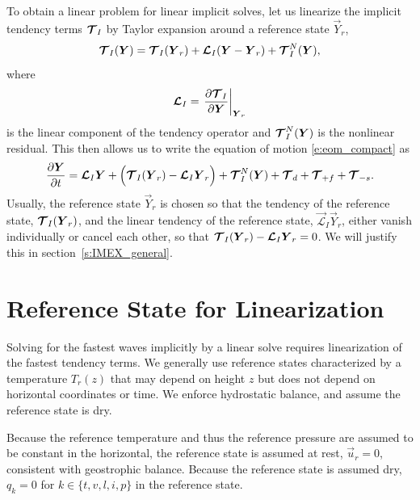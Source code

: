 \documentclass{report}
\begin{document}
To obtain a linear problem for linear implicit solves, let us linearize the implicit tendency terms $\boldsymbol{{\mathcal{T}}}_{I}$ by Taylor expansion around a reference state $\vec{Y}_r$,
\begin{equation}\label{e:imex_linearization}
\boldsymbol{{\mathcal{T}}}_{I}(\boldsymbol{{Y}}) =  \boldsymbol{{\mathcal{T}}}_I(\boldsymbol{{Y}}_r) + \boldsymbol{{\mathcal{L}}}_I (\boldsymbol{{Y}} - \boldsymbol{{Y}}_r) + \boldsymbol{{\mathcal{T}}}^N_{I}(\boldsymbol{{Y}}),
\end{equation}
where 
\begin{equation}
    \boldsymbol{{\mathcal{L}}}_I = \left. \frac{\partial\boldsymbol{{\mathcal{T}}}_I}{\partial\boldsymbol{{Y}}}\right|_{\boldsymbol{{Y}}_r}
\end{equation} 
is the linear component of the tendency operator and $\boldsymbol{{\mathcal{T}}}^N_{I}(\boldsymbol{{Y}})$ is the nonlinear residual. This then allows us to write the equation of motion \eqref{e:eom_compact} as
\begin{equation}
\label{e:IMEX}
\frac{\partial\boldsymbol{{Y}}}{\partial t} =  \boldsymbol{{\mathcal{L}}}_I \boldsymbol{{Y}} + \Bigl(\boldsymbol{{\mathcal{T}}}_I(\boldsymbol{{Y}}_r) - \boldsymbol{{\mathcal{L}}}_I \boldsymbol{{Y}}_r\Bigr) + \boldsymbol{{\mathcal{T}}}^N_{I}(\boldsymbol{{Y}}) + \boldsymbol{{\mathcal{T}}}_{d} + \boldsymbol{{\mathcal{T}}}_{+f} + \boldsymbol{{\mathcal{T}}}_{-s}.
\end{equation}
Usually, the reference state $\vec{Y}_r$ is chosen so that the tendency of the reference state, $\boldsymbol{{\mathcal{T}}}_I(\boldsymbol{{Y}}_r)$, and the linear tendency of the reference state, $\vec{\mathcal{L}}_I \vec{Y}_r$, either vanish individually or cancel each other, so that $\boldsymbol{{\mathcal{T}}}_I(\boldsymbol{{Y}}_r) - \boldsymbol{{\mathcal{L}}}_I \boldsymbol{{Y}}_r=0$. We will justify this in section~\ref{s:IMEX_general}.

\section{Reference State for Linearization}

Solving for the fastest waves implicitly by a linear solve requires linearization of the fastest tendency terms. We generally use reference states characterized by a temperature $T_r(z)$ that may depend on height $z$ but does not depend on horizontal coordinates or time. We enforce hydrostatic balance, and assume the reference state is dry.

Because the reference temperature and thus the reference pressure are assumed to be constant in the horizontal, the reference state is assumed at rest, $\vec{u}_r = 0$, consistent with geostrophic balance. Because the reference state is assumed dry, $q_k= 0$ for $k \in \{ t, v, l, i, p\}$ in the reference state.
\end{document}
